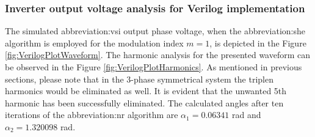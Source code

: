 \documentclass[a4paper, twoside, 11pt]{article}
\begin{document}
        
    \FloatBarrier

    \subsubsection{Inverter output voltage analysis for Verilog implementation}
        The simulated \gls{abbreviation:vsi} output phase voltage, when the \gls{abbreviation:she} algorithm is employed for the modulation index $m = 1$, is depicted in the Figure \ref{fig:VerilogPlotWaveform}. The harmonic analysis for the presented waveform can be observed in the Figure \ref{fig:VerilogPlotHarmonics}. As mentioned in previous sections, please note that in the 3-phase symmetrical system the triplen harmonics would be eliminated as well. It is evident that the unwanted 5th harmonic has been successfully eliminated. The calculated angles after ten iterations of the \gls{abbreviation:nr} algorithm are $\alpha_1 = 0.06341$ rad and $\alpha_2 = 1.320098$ rad.
\end{document}
